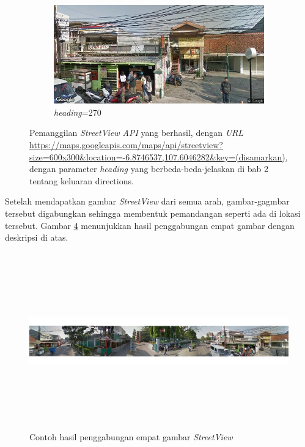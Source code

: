 \begin{figure}[]
\begin{subfigure}{.5\textwidth}
  		\label{fig:streetview180}
	\end{subfigure}
	\begin{subfigure}{.5\textwidth}
  		\centering
  		\includegraphics[width=1\linewidth]{Gambar/streetview270.png}
  		\caption{\textit{heading}=270}
  		\label{fig:streetview270}
	\end{subfigure}
	\caption{Pemanggilan \textit{StreetView API} yang berhasil, dengan \textit{URL} \url{https://maps.googleapis.com/maps/api/streetview?size=600x300\&location=-6.8746537,107.6046282\&key=(disamarkan)}, dengan parameter \textit{heading} yang berbeda-beda-jelaskan di bab 2 tentang keluaran directions.}
\label{fig:comp-streetview}
\end{figure}

Setelah mendapatkan gambar \textit{StreetView} dari semua arah, gambar-gagmbar tersebut digabungkan sehingga membentuk pemandangan seperti ada di lokasi tersebut. Gambar \ref{fig:streetview-vr} menunjukkan hasil penggabungan empat gambar dengan deskripsi di atas.

\begin{figure}[h]
	\centering
		\includegraphics[width=6.5in,height=3in]{Gambar/connected_streetview.png}
	\caption{Contoh hasil penggabungan empat gambar \textit{StreetView}}
	\label{fig:streetview-vr}
\end{figure}

